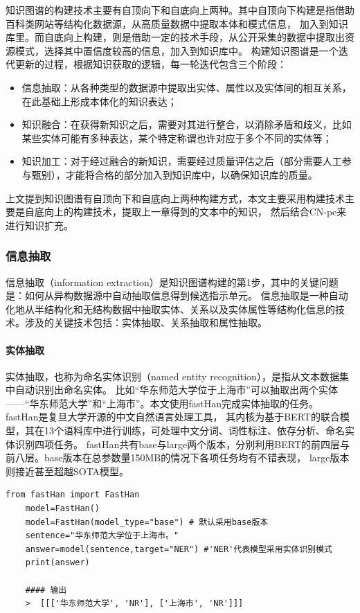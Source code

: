 \documentclass[12pt,a4paper,fancyhdr,openany,oneside]{ctexbook}
\begin{document}
知识图谱的构建技术主要有自顶向下和自底向上两种。其中自顶向下构建是指借助百科类网站等结构化数据源，从高质量数据中提取本体和模式信息，
加入到知识库里。而自底向上构建，则是借助一定的技术手段，从公开采集的数据中提取出资源模式，选择其中置信度较高的信息，加入到知识库中。
构建知识图谱是一个迭代更新的过程，根据知识获取的逻辑，每一轮迭代包含三个阶段：
\begin{itemize}
    \item 信息抽取：从各种类型的数据源中提取出实体、属性以及实体间的相互关系，在此基础上形成本体化的知识表达；
    \item 知识融合：在获得新知识之后，需要对其进行整合，以消除矛盾和歧义，比如某些实体可能有多种表达，某个特定称谓也许对应于多个不同的实体等；
    \item 知识加工：对于经过融合的新知识，需要经过质量评估之后（部分需要人工参与甄别），才能将合格的部分加入到知识库中，以确保知识库的质量。
\end{itemize}

上文提到知识图谱有自顶向下和自底向上两种构建方式，本文主要采用构建技术主要是自底向上的构建技术，提取上一章得到的文本中的知识，
然后结合CN-pe来进行知识扩充。
\subsubsection{信息抽取}
信息抽取（information extraction）是知识图谱构建的第1步，其中的关键问题是：如何从异构数据源中自动抽取信息得到候选指示单元。
信息抽取是一种自动化地从半结构化和无结构数据中抽取实体、关系以及实体属性等结构化信息的技术。涉及的关键技术包括：实体抽取、关系抽取和属性抽取。

\paragraph{实体抽取}实体抽取，也称为命名实体识别（named entity recognition），是指从文本数据集中自动识别出命名实体。
比如“华东师范大学位于上海市”可以抽取出两个实体——“华东师范大学”和“上海市”。本文使用fastHan完成实体抽取的任务。
fastHan是复旦大学开源的中文自然语言处理工具，
其内核为基于BERT的联合模型，其在13个语料库中进行训练，可处理中文分词、词性标注、依存分析、命名实体识别四项任务。
fastHan共有base与large两个版本，分别利用BERT的前四层与前八层。base版本在总参数量150MB的情况下各项任务均有不错表现，
large版本则接近甚至超越SOTA模型。\cite{geng-etal-2021-fasthan}
\begin{lstlisting}[style=Python, caption={ner.py}, label={ner.py}]
    from fastHan import FastHan
    model=FastHan()
    model=FastHan(model_type="base") # 默认采用base版本
    sentence="华东师范大学位于上海市。"
    answer=model(sentence,target="NER") #'NER'代表模型采用实体识别模式
    print(answer)

    #### 输出
    >  [[['华东师范大学', 'NR'], ['上海市', 'NR']]]
\end{lstlisting}
\end{document}
